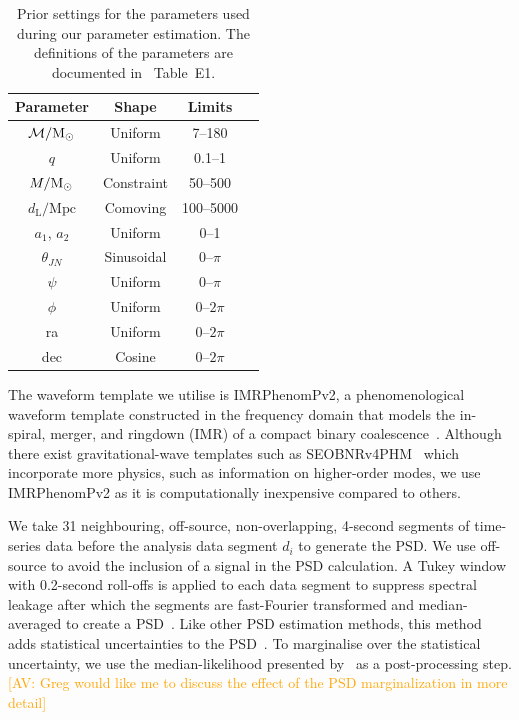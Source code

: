 \documentclass[%
 nofootinbib,
 amsmath,amssymb,
 aps,
 twocolumn
]{revtex4-2}
\newcommand{\imrphenomp}{{\sc IMRPhenomPv2}\xspace}
\newcommand{\seob}{{\sc SEOBNRv4PHM}\xspace}
\newcommand{\mathcmd}[1]{{\sc \relax\ifmmode#1\else $#1$\fi}\xspace}
\newcommand{\msun}{\mathcmd{\text{M}_\odot}}
\newcommand{\avi}[1]{\textcolor{orange}{[AV: #1]}}
\begin{document}
\begin{table}
    \centering
    \caption{
    Prior settings for the parameters used during our parameter estimation. The definitions of the parameters are documented in \citet{bilby_gwtc}~Table~E1.\label{tab:priors}}
    \begin{tabular}{c c c c}
    \hline
    Parameter & Shape & Limits \\
    \hline
          $\mathcal{M}/\msun$           & Uniform & 7--180  \\
          $q$                           & Uniform & 0.1--1  \\
          $M/\msun$                     & Constraint & 50--500  \\
          $d_\mathrm{L}/\mathrm{Mpc}$   & Comoving & 100--5000  \\
          $a_1$, $a_2$                  & Uniform & 0--1  \\
          $\theta_{JN}$                 & Sinusoidal & 0--$\pi$  \\
          $\psi$                        & Uniform & 0--$\pi$  \\
          $\phi$                        & Uniform & 0--$2\pi$  \\
          ra                            & Uniform & 0--$2\pi$  \\
          dec                           & Cosine & 0--$2\pi$  \\
    \hline
    \end{tabular}
\end{table}

The waveform template we utilise is \imrphenomp, a phenomenological waveform template constructed in the frequency domain that models the in-spiral, merger, and ringdown (IMR) of a compact binary coalescence~\citep{khan2016frequency}. Although there exist gravitational-wave templates such as \seob~\cite{seobnrv4phm} which incorporate more physics, such as information on higher-order modes, we use \imrphenomp as it is computationally inexpensive compared to others.

We take 31 neighbouring, off-source, non-overlapping,  4-second  segments of time-series data before the analysis data segment $d_i$ to generate the PSD. We use off-source to avoid the inclusion of a signal in the PSD calculation. A Tukey window with 0.2-second roll-offs is applied to each data segment to suppress spectral leakage after which the segments are fast-Fourier transformed and median-averaged to create a PSD~\cite{ligo_psd}. Like other PSD estimation methods, this method adds statistical uncertainties to the PSD~\cite{psd_student_t, chatziioannou2019noise}. To marginalise over the statistical uncertainty, we use the median-likelihood presented by~\citet{psd_student_t} as a post-processing step. 
\avi{Greg would like me to discuss the effect of the PSD marginalization in more detail}
\end{document}
